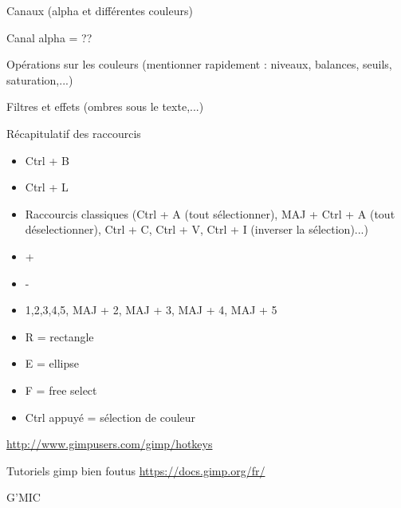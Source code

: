 \documentclass[10pt,svgnames,usenames,table]{beamer}
\begin{document}
\begin{frame}
	Canaux (alpha et différentes couleurs)
	
	Canal alpha = ??
	
	Opérations sur les couleurs (mentionner rapidement : niveaux, balances, seuils, saturation,...)
\end{frame}

\begin{frame}
	Filtres et effets (ombres sous le texte,...)
\end{frame}

\begin{frame}
\end{frame}

\appendix 

\begin{frame}
	Récapitulatif des raccourcis 
	\begin{itemize}
	\item Ctrl + B
	\item Ctrl + L
	\item Raccourcis classiques (Ctrl + A (tout sélectionner), MAJ + Ctrl + A (tout déselectionner), Ctrl + C, Ctrl + V, Ctrl + I (inverser la sélection)...)
	\item +
	\item -
	\item 1,2,3,4,5, MAJ + 2, MAJ + 3, MAJ + 4, MAJ + 5  
	\item R = rectangle 
	\item E = ellipse 
	\item F = free select
	\item Ctrl appuyé = sélection de couleur
	\end{itemize}
	
	\url{http://www.gimpusers.com/gimp/hotkeys}
\end{frame}

\begin{frame}
	Tutoriels gimp bien foutus
	\url{https://docs.gimp.org/fr/}
\end{frame}

\begin{frame}
	G'MIC
\end{frame}
\end{document}
